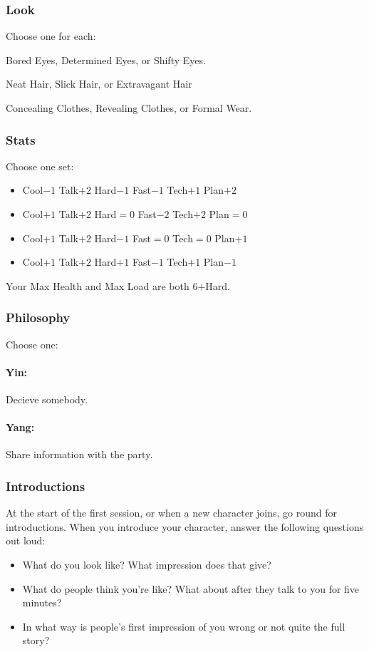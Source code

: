 \subsubsection{Look}
Choose one for each:

Bored Eyes, Determined Eyes, or Shifty Eyes.

Neat Hair, Slick Hair, or Extravagant Hair

Concealing Clothes, Revealing Clothes, or Formal Wear.

\subsubsection{Stats}
Choose one set:
\begin{itemize}
\setlength\itemsep{0em}
\item Cool$-1$ Talk$+2$ Hard$-1$ Fast$-1$ Tech$+1$ Plan$+2$
\item Cool$+1$ Talk$+2$ Hard${=}0$ Fast$-2$ Tech$+2$ Plan${=}0$
\item Cool$+1$ Talk$+2$ Hard$-1$ Fast${=}0$ Tech${=}0$ Plan$+1$
\item Cool$+1$ Talk$+2$ Hard$+1$ Fast$-1$ Tech$+1$ Plan$-1$
\end{itemize}

Your Max Health and Max Load are both 6+Hard.

\subsubsection{Philosophy}
Choose one:
\paragraph{Yin:} Decieve somebody.
\paragraph{Yang:} Share information with the party.

\subsubsection{Introductions}
At the start of the first session, or when a new character joins, go round for introductions.
When you introduce your character, answer the following questions out loud:
\begin{itemize}
\item What do you look like? What impression does that give?
\item What do people think you're like? What about after they talk to you for five minutes?
\item In what way is people's first impression of you wrong or not quite the full story?
\end{itemize}

